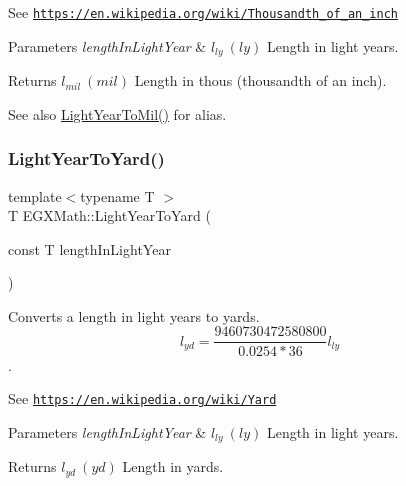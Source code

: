 See \href{https://en.wikipedia.org/wiki/Thousandth_of_an_inch}{\tt https\+://en.\+wikipedia.\+org/wiki/\+Thousandth\+\_\+of\+\_\+an\+\_\+inch} 
\begin{DoxyParams}{Parameters}
{\em length\+In\+Light\+Year} & $ l_{ly}\ (ly)$ Length in light years. \\
\hline
\end{DoxyParams}
\begin{DoxyReturn}{Returns}
$ l_{mil}\ (mil)$ Length in thous (thousandth of an inch). 
\end{DoxyReturn}
\begin{DoxySeeAlso}{See also}
\mbox{\hyperlink{group___e_g_x_math-_conversions-_length_conversions-_astronomical-_light_year-_imperial_ga980a3d37f73ebc5f217366ee01e7b4ae}{Light\+Year\+To\+Mil()}} for alias. 
\end{DoxySeeAlso}
\mbox{\label{group___e_g_x_math-_conversions-_length_conversions-_astronomical-_light_year-_imperial_ga78ce9f584c98c3ad8c4daaebb76030d3}} 
\subsubsection{\texorpdfstring{Light\+Year\+To\+Yard()}{LightYearToYard()}}
{\footnotesize\ttfamily template$<$typename T $>$ \\
T E\+G\+X\+Math\+::\+Light\+Year\+To\+Yard (\begin{DoxyParamCaption}\item[{const T}]{length\+In\+Light\+Year }\end{DoxyParamCaption})}



Converts a length in light years to yards. \[ l_{yd}= \frac{9460730472580800}{0.0254 * 36} l_{ly} \]. 

See \href{https://en.wikipedia.org/wiki/Yard}{\tt https\+://en.\+wikipedia.\+org/wiki/\+Yard} 
\begin{DoxyParams}{Parameters}
{\em length\+In\+Light\+Year} & $ l_{ly}\ (ly)$ Length in light years. \\
\hline
\end{DoxyParams}
\begin{DoxyReturn}{Returns}
$ l_{yd}\ (yd)$ Length in yards. 
\end{DoxyReturn}
